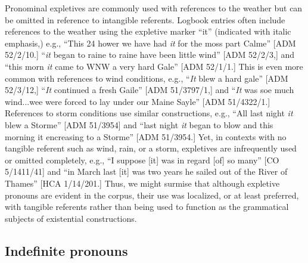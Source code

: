 Pronominal expletives are commonly used with references to the weather but can be omitted in reference to intangible referents.  Logbook entries often include references to the weather using the expletive marker “it” (indicated with italic emphasis,) e.g., “This 24 hower we have had \textit{it} for the moss part Calme” [ADM 52/2/10.] “\textit{it} began to raine to raine have been little wind” [ADM 52/2/3,] and “this morn \textit{it} came to WNW a very hard Gale” [ADM 52/1/1.] This is even more common with references to wind conditions, e.g., “\textit{It} blew a hard gale” [ADM 52/3/12,] “\textit{It} continued a fresh Gaile” [ADM 51/3797/1,] and “\textit{It} was soe much wind...wee were forced to lay under our Maine Sayle” [ADM 51/4322/1.] References to storm conditions use similar constructions, e.g., “All last night \textit{it} blew a Storme” [ADM 51/3954] and “last night \textit{it} began to blow and this morning it encreasing to a Storme” [ADM 51/3954.] Yet, in contexts with no tangible referent such as wind, rain, or a storm, expletives are infrequently used or omitted completely, e.g., “I suppose [it] was in regard [of] so many” [CO 5/1411/41] and “in March last [it] was two years he sailed out of the River of Thames” [HCA 1/14/201.] Thus, we might surmise that although expletive pronouns are evident in the corpus, their use was localized, or at least preferred, with tangible referents rather than being used to function as the grammatical subjects of existential constructions.

\subsection{\textbf{Indefinite} \textbf{pronouns}}%

